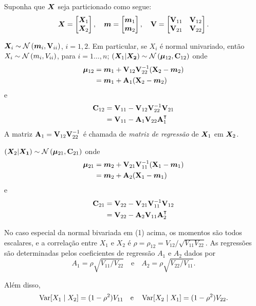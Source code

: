 \begin{theorem}
	Suponha que $\bm{X}$ seja particionado como segue:
	\[
	\bm{X} = \begin{bmatrix}
		\bm{X}_1 \\ \bm{X}_2
	\end{bmatrix}, \quad
	\bm{m} = \begin{bmatrix}
		\bm{m}_1 \\ \bm{m}_2
	\end{bmatrix}, \quad
	\mathbf{V} = \begin{bmatrix}
		\mathbf{V}_{11} & \mathbf{V}_{12} \\ \mathbf{V}_{21} & \mathbf{V}_{22}
	\end{bmatrix}.
	\]
	
	\begin{outline}[enumerate]
		\1 $\v{X}_i \sim \normdist{\v{m}_i, \m{V}_{ii}}$, $i=1,2$. Em particular, se $X_i$ é normal univariado, então $X_i\sim\normdist{m_i, V_{ii}}$, para $i=1\ldots,n$;
		\1 \( (\v{X}_1|\v{X_2}) \sim \normdist{ \v{\mu}_{12}, \m{C}_{12}} \) onde
		\begin{align}
			\bm{\mu}_{12} &= \bm{m}_1 + \mathbf{V}_{12}\mathbf{V}_{22}^{-1}(\mathbf{X}_2-\bm{m}_2) \\
			&= \bm{m}_1 + \mathbf{A}_1(\mathbf{X}_2-\bm{m}_2)
		\end{align} e
		\begin{align}
			\m{C}_{12} &= \m{V}_{11} - \m{V}_{12}\m{V}_{22}\inv\m{V}_{21} \\
			&= \m{V}_{11} - \m{A}_1\m{V}_{22}\m{A}_1\T
		\end{align}
		A matriz $\mathbf{A}_1 = \mathbf{V}_{12}\mathbf{V}_{22}^{-1}$ é chamada de \textit{matriz de regressão} de $\bm{X}_1$ em $\bm{X}_2$.
		
		\1 \( (\v{X}_2|\v{X_1}) \sim \normdist{ \v{\mu}_{21}, \m{C}_{21}} \) onde
		\begin{align}
			\bm{\mu}_{21} &= \bm{m}_2 + \mathbf{V}_{21}\mathbf{V}_{11}^{-1}(\mathbf{X}_1-\bm{m}_1) \\
			&= \bm{m}_2 + \mathbf{A}_2(\mathbf{X}_1-\bm{m}_1)
		\end{align} e
		\begin{align}
			\m{C}_{21} &= \m{V}_{22} - \m{V}_{21}\m{V}_{11}\inv\m{V}_{12} \\
			&= \m{V}_{22} - \m{A}_2\m{V}_{11}\m{A}_2\T
		\end{align}
		
		\1 No caso especial da normal bivariada em (1) acima, os momentos são todos escalares, e a correlação entre $X_1$ e $X_2$ é $\rho = \rho_{12} = V_{12}/\sqrt{V_{11}V_{22}}$. As regressões são determinadas pelos coeficientes de regressão $A_1$ e $A_2$ dados por
		\[
			A_1 = \rho\sqrt{V_{11}/V_{22}} \quad \text{e} \quad A_2 = \rho\sqrt{V_{22}/V_{11}}.
		\]
		
		Além disso,
		\[
			\operatorname{Var}[X_1 \mid X_2] = (1-\rho^2)V_{11} \quad \text{e} \quad \operatorname{Var}[X_2 \mid X_1] = (1-\rho^2)V_{22}.
		\]
	\end{outline}
\end{theorem}

